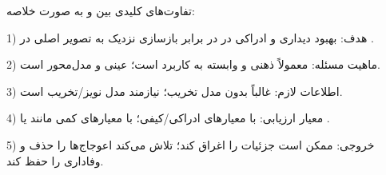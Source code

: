 تفاوت‌های کلیدی بین  و  به صورت خلاصه:

1) هدف: بهبود دیداری و ادراکی در  در برابر بازسازی نزدیک به تصویر اصلی در .

2) ماهیت مسئله:  معمولاً ذهنی و وابسته به کاربرد است؛  عینی و مدل‌محور است.

3) اطلاعات لازم:  غالباً بدون مدل تخریب؛  نیازمند مدل نویز/تخریب است.

4) معیار ارزیابی:  با معیارهای ادراکی/کیفی؛  با معیارهای کمی مانند  یا .

5) خروجی:  ممکن است جزئیات را اغراق کند؛  تلاش می‌کند اعوجاج‌ها را حذف و وفاداری را حفظ کند.